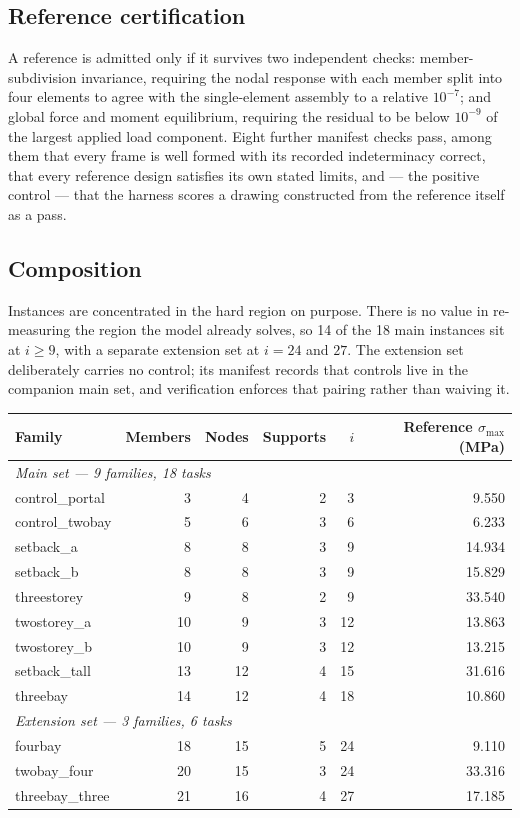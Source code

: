 \documentclass[11pt,a4paper]{article}
\begin{document}
\subsection{Reference certification}

A reference is admitted only if it survives two independent checks: member-subdivision invariance,
requiring the nodal response with each member split into four elements to agree with the single-element
assembly to a relative $10^{-7}$; and global force and moment equilibrium, requiring the residual to be
below $10^{-9}$ of the largest applied load component. Eight further manifest checks pass, among them
that every frame is well formed with its recorded indeterminacy correct, that every reference design
satisfies its own stated limits, and --- the positive control --- that the harness scores a drawing
constructed from the reference itself as a pass.

\subsection{Composition}

Instances are concentrated in the hard region on purpose. There is no value in re-measuring the region
the model already solves, so 14 of the 18 main instances sit at $i \geq 9$, with a separate extension
set at $i = 24$ and $27$. The extension set deliberately carries no control; its manifest records that
controls live in the companion main set, and verification enforces that pairing rather than waiving it.

\begin{center}
\begin{tabular}{lrrrrr}
\toprule
Family & Members & Nodes & Supports & $i$ & Reference $\sigma_{\max}$ (MPa) \\
\midrule
\multicolumn{6}{l}{\itshape Main set --- 9 families, 18 tasks} \\
control\_portal & 3 & 4 & 2 & 3 & 9.550 \\
control\_twobay & 5 & 6 & 3 & 6 & 6.233 \\
setback\_a & 8 & 8 & 3 & 9 & 14.934 \\
setback\_b & 8 & 8 & 3 & 9 & 15.829 \\
threestorey & 9 & 8 & 2 & 9 & 33.540 \\
twostorey\_a & 10 & 9 & 3 & 12 & 13.863 \\
twostorey\_b & 10 & 9 & 3 & 12 & 13.215 \\
setback\_tall & 13 & 12 & 4 & 15 & 31.616 \\
threebay & 14 & 12 & 4 & 18 & 10.860 \\
\midrule
\multicolumn{6}{l}{\itshape Extension set --- 3 families, 6 tasks} \\
fourbay & 18 & 15 & 5 & 24 & 9.110 \\
twobay\_four & 20 & 15 & 3 & 24 & 33.316 \\
threebay\_three & 21 & 16 & 4 & 27 & 17.185 \\
\bottomrule
\end{tabular}
\end{center}
\end{document}

